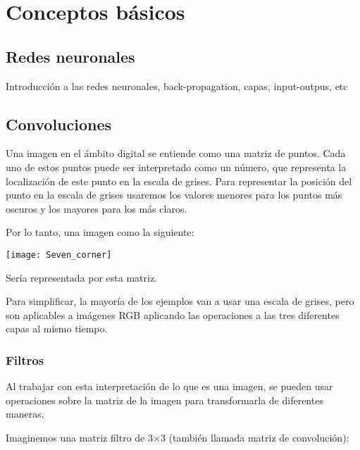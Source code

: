 \chapter{Conceptos básicos}

\label{BasicConcepts}

\section{Redes neuronales}
Introducción a las redes neuronales, back-propagation, capas, input-outpus, etc


\section{Convoluciones}

Una imagen en el ámbito digital se entiende como una matriz de puntos.
Cada uno de estos puntos puede ser interpretado como un número, que representa la localización de este punto en la escala de grises. Para representar la posición del punto en la escala de grises usaremos los valores menores para los puntos más oscuros y los mayores para los más claros.

Por lo tanto, una imagen como la siguiente:
\begin{center}
  \texttt{[image: Seven\_corner]}
\end{center}

Sería representada por esta matriz.

\begin{center}
\end{center}

Para simplificar, la mayoría de los ejemplos van a usar una escala de grises, pero son aplicables a imágenes RGB aplicando las operaciones a las tres diferentes capas al mismo tiempo.

\subsection{Filtros}

Al trabajar con esta interpretación de lo que es una imagen, se pueden usar operaciones sobre la matriz de la imagen para transformarla de diferentes maneras.

Imaginemos una matriz filtro de 3$\times$3 (también llamada matriz de convolución):

